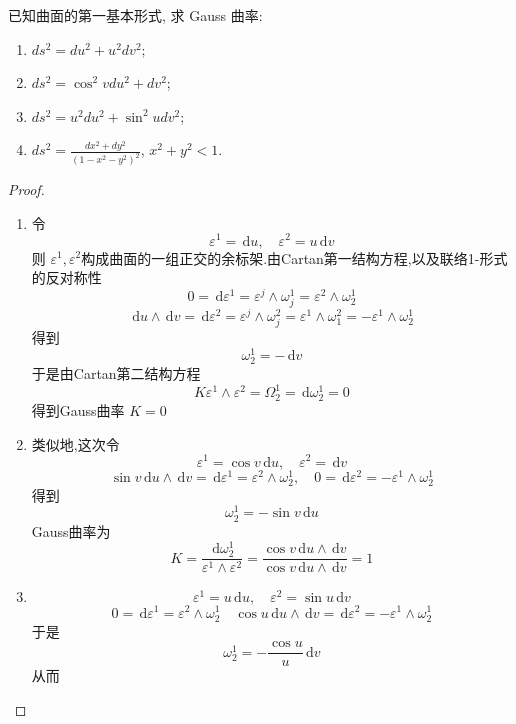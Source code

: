 \documentclass[../../main.tex]{subfiles}
\begin{document}
\begin{problem}
 已知曲面的第一基本形式, 求 Gauss 曲率:
\begin{enumerate}
\item $ds^2 = du^2 + u^2 dv^2$;
\item $ds^2 = \cos^2 v du^2 + dv^2$;
\item $ds^2 = u^2 du^2 + \sin^2 u dv^2$;
\item $ds^2 = \frac{dx^2 + dy^2}{(1-x^2-y^2)^2}$, $x^2+y^2 < 1$.
\end{enumerate}
\end{problem}
\begin{proof}
    \begin{enumerate}
        \item 令 \[
     \varepsilon ^{1}= \,\mathrm{d} u,\quad  \varepsilon ^{2}= u\,\mathrm{d} v
    \]则 \(   \varepsilon ^{1}, \varepsilon ^{2}  \)构成曲面的一组正交的余标架.由Cartan第一结构方程,以及联络1-形式的反对称性 \[
    0= \,\mathrm{d}  \varepsilon ^{1}=  \varepsilon ^{j}\wedge  \omega _{j}^{1}=  \varepsilon ^{2}\wedge  \omega _{2}^{1}
    \] \[
    \,\mathrm{d} u\wedge \,\mathrm{d} v= \,\mathrm{d}  \varepsilon ^{2}=  \varepsilon ^{j}\wedge  \omega _{j}^{2}=  \varepsilon ^{1}\wedge  \omega _{1}^{2}= - \varepsilon ^{1}\wedge  \omega _{2}^{1}
    \]得到 \[
     \omega _{2}^{1}= -\,\mathrm{d} v
    \]于是由Cartan第二结构方程 \[
   K \varepsilon ^{1}\wedge  \varepsilon ^{2}=   \Omega _{2}^{1}= \,\mathrm{d}  \omega _{2}^{1}= 0
    \]得到Gauss曲率 \(  K= 0  \)
    \item 类似地,这次令 \[
     \varepsilon ^{1}= \cos v\,\mathrm{d} u,\quad  \varepsilon ^{2}= \,\mathrm{d} v
    \]  \[
    \sin v\,\mathrm{d} u\wedge \,\mathrm{d} v= \,\mathrm{d}  \varepsilon ^{1}=  \varepsilon ^{2}\wedge  \omega _{2}^{1},\quad 0= \,\mathrm{d}  \varepsilon ^{2}=  - \varepsilon ^{1}\wedge  \omega _{2}^{1}
    \]得到  \[
     \omega _{2}^{1}= -\sin v\,\mathrm{d} u
    \]Gauss曲率为 \[
K= \frac{\,\mathrm{d}  \omega _{2}^{1} }{ \varepsilon ^{1}\wedge  \varepsilon ^{2} }= \frac{\cos v\,\mathrm{d} u\wedge \,\mathrm{d} v }{\cos v\,\mathrm{d} u\wedge \,\mathrm{d} v }= 1  
    \]
    \item \[
     \varepsilon ^{1}= u\,\mathrm{d} u,\quad  \varepsilon ^{2}= \sin u\,\mathrm{d} v
    \] \[
    0= \,\mathrm{d}  \varepsilon ^{1}=  \varepsilon ^{2}\wedge  \omega _{2}^{1}\quad \cos u\,\mathrm{d} u\wedge \,\mathrm{d} v= \,\mathrm{d}  \varepsilon ^{2}= - \varepsilon ^{1}\wedge  \omega _{2}^{1}
    \]于是 \[
     \omega _{2}^{1}= -\frac{\cos u }{u }\,\mathrm{d} v 
    \]从而 \[
\]
\end{enumerate}
\end{proof}
\end{document}
